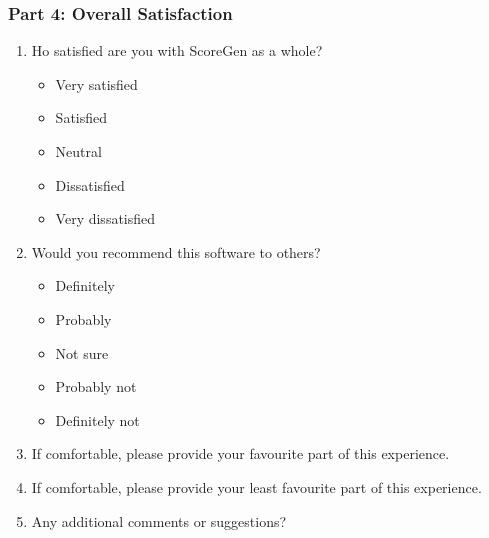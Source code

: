 \documentclass[12pt, titlepage]{article}
\begin{document}
\subsubsection*{Part 4: Overall Satisfaction}
\begin{enumerate}[resume, leftmargin=*]
  \item Ho satisfied are you with ScoreGen as a whole?
  \begin{itemize}
    \item Very satisfied
    \item Satisfied
    \item Neutral
    \item Dissatisfied
    \item Very dissatisfied
  \end{itemize}
  \item Would you recommend this software to others?
  \begin{itemize}
    \item Definitely
    \item Probably
    \item Not sure
    \item Probably not
    \item Definitely not
  \end{itemize}
  \item If comfortable, please provide your favourite part of this experience.
  
  \vspace{5pt}
  \hrulefill
  \item If comfortable, please provide your least favourite part of this experience.
  
  \vspace{5pt}
  \hrulefill
  \item Any additional comments or suggestions?
  
  \vspace{5pt}
  \hrulefill
\end{enumerate}
\end{document}
